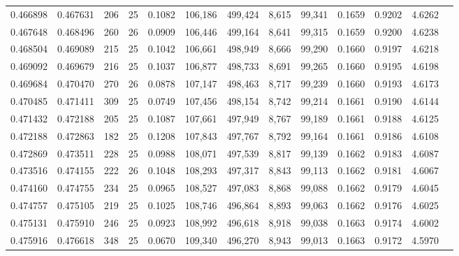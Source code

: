\begin{tabular}{rrrrrrrrrrrrr}
0.466898 & 0.467631 &   206 &  25 &                                     0.1082 & 106,186 & 499,424 &   8,615 &  99,341 & 0.1659 & 0.9202 & 4.6262 \\
0.467648 & 0.468496 &   260 &  26 &                                     0.0909 & 106,446 & 499,164 &   8,641 &  99,315 & 0.1659 & 0.9200 & 4.6238 \\
0.468504 & 0.469089 &   215 &  25 &                                     0.1042 & 106,661 & 498,949 &   8,666 &  99,290 & 0.1660 & 0.9197 & 4.6218 \\
0.469092 & 0.469679 &   216 &  25 &                                     0.1037 & 106,877 & 498,733 &   8,691 &  99,265 & 0.1660 & 0.9195 & 4.6198 \\
0.469684 & 0.470470 &   270 &  26 &                                     0.0878 & 107,147 & 498,463 &   8,717 &  99,239 & 0.1660 & 0.9193 & 4.6173 \\
0.470485 & 0.471411 &   309 &  25 &                                     0.0749 & 107,456 & 498,154 &   8,742 &  99,214 & 0.1661 & 0.9190 & 4.6144 \\
0.471432 & 0.472188 &   205 &  25 &                                     0.1087 & 107,661 & 497,949 &   8,767 &  99,189 & 0.1661 & 0.9188 & 4.6125 \\
0.472188 & 0.472863 &   182 &  25 &                                     0.1208 & 107,843 & 497,767 &   8,792 &  99,164 & 0.1661 & 0.9186 & 4.6108 \\
0.472869 & 0.473511 &   228 &  25 &                                     0.0988 & 108,071 & 497,539 &   8,817 &  99,139 & 0.1662 & 0.9183 & 4.6087 \\
0.473516 & 0.474155 &   222 &  26 &                                     0.1048 & 108,293 & 497,317 &   8,843 &  99,113 & 0.1662 & 0.9181 & 4.6067 \\
0.474160 & 0.474755 &   234 &  25 &                                     0.0965 & 108,527 & 497,083 &   8,868 &  99,088 & 0.1662 & 0.9179 & 4.6045 \\
0.474757 & 0.475105 &   219 &  25 &                                     0.1025 & 108,746 & 496,864 &   8,893 &  99,063 & 0.1662 & 0.9176 & 4.6025 \\
0.475131 & 0.475910 &   246 &  25 &                                     0.0923 & 108,992 & 496,618 &   8,918 &  99,038 & 0.1663 & 0.9174 & 4.6002 \\
0.475916 & 0.476618 &   348 &  25 &                                     0.0670 & 109,340 & 496,270 &   8,943 &  99,013 & 0.1663 & 0.9172 & 4.5970 \\

\end{tabular}
